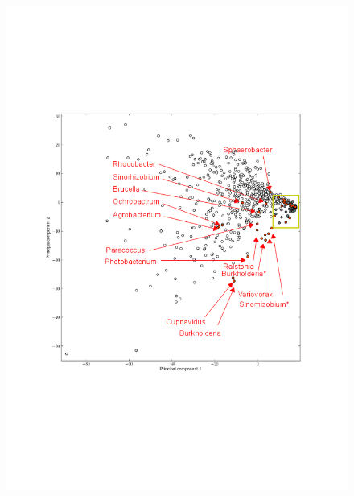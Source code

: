 \begin{figure}[H]
\begin{minipage}{0.55\textwidth}
		\includegraphics[trim=2cm 7cm 2cm 6cm,clip, width=\textwidth]{./img/pca_norm_func.png}
		\label{figpcavrnorm}
	\end{minipage}
	\begin{minipage}{0.55\textwidth}

\end{minipage}
\end{figure}
